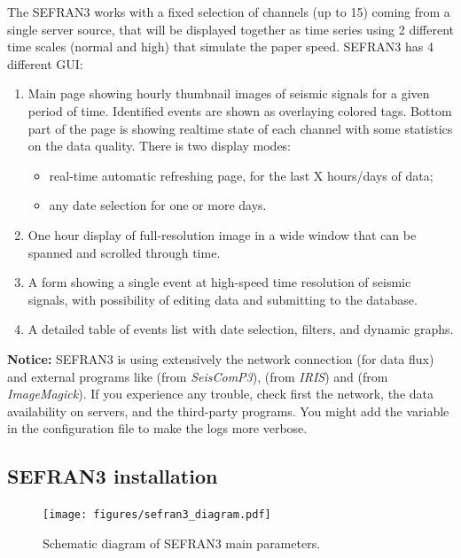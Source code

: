 The SEFRAN3 works with a fixed selection of channels (up to 15) coming from a single server source, that will be displayed together as time series using 2 different time scales (normal and high) that simulate the paper speed. SEFRAN3 has 4 different GUI:
\begin{enumerate}

\item Main page showing hourly thumbnail images of seismic signals for a given period of time. Identified events are shown as overlaying colored tags. Bottom part of the page is showing realtime state of each channel with some statistics on the data quality. There is two display modes:
\begin{itemize}
\item real-time automatic refreshing page, for the last X hours/days of data;
\item any date selection for one or more days.
\end{itemize}

\item One hour display of full-resolution image in a wide window that can be spanned and scrolled through time.

\item A form showing a single event at high-speed time resolution of seismic signals, with possibility of editing data and submitting to the database.

\item A detailed table of events list with date selection, filters, and dynamic graphs.

\end{enumerate}

\textbf{Notice:} SEFRAN3 is using extensively the network connection (for data flux) and external programs like  (from \textit{SeisComP3}),  (from \textit{IRIS}) and  (from \textit{ImageMagick}). If you experience any trouble, check first the network, the data availability on servers, and the third-party programs. You might add the variable  in the configuration file to make the logs more verbose.

\subsection{SEFRAN3 installation}


\begin{figure}
\texttt{[image: figures/sefran3\_diagram.pdf]}
\caption{Schematic diagram of SEFRAN3 main parameters.}
\label{sefran3_diagram}
\end{figure}

